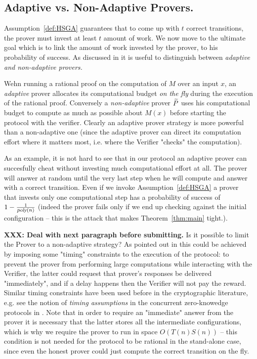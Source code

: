 \subsection{Adaptive vs. Non-Adaptive Provers.}

Assumption~\ref{def:HSGA} guarantees that to come up with $t$ correct transitions, the prover must invest at least $t$ amount of work. We now move to the ultimate goal which is to link the amount of work invested by the prover, to his probability of success. 
As discussed in \cite{cg15} it is useful to distinguish between {\em adaptive and non-adaptive provers.}

Wehn running a rational proof on the computation of $M$ over an input $x$, an {\em adaptive} prover allocates its computational budget  {\em on the fly} during the execution of the rational proof. Conversely a {\em non-adaptive} prover $\widetilde{P}$ uses his computational budget to compute as much as possible about $M(x)$ before starting the protocol with the verifier. Clearly an adaptive prover strategy is more powerful than a non-adaptive one (since the adaptive prover can direct its computation effort where it matters most, i.e. where the Verifier "checks" the computation).

As an example, it is not hard to see that in our protocol an adaptive prover can 
succesfully cheat without investing much computational effort at all. The prover will answer at random until the very last step when he will compute and answer with a correct transition. Even if we invoke Assumption~\ref{def:HSGA} a prover that invests only one computational step has a probability of success of  $1-\frac{1}{{\textsl{poly}}(n)}$ (indeed the prover fails only if we end up checking against the initial configuration -- this is the attack that makes Theorem~\ref{thm:main} tight.). 

\textbf{XXX: Deal with next paragraph before submitting.}
Is it possible to limit the Prover to a non-adaptive strategy? As pointed out in \cite{cg15} this could be achieved by imposing some "timing" constraints to the execution of the protocol: to prevent the prover from performing large computations while interacting with the Verifier, the latter could request that prover's responses be delivered "immediately", and if a delay happens then the Verifier will not pay the reward. Similar timing constraints have been used before in the cryptographic literature, e.g. see the notion of {\em timing assumptions} in the concurrent zero-knowedge protocols in \cite{dns}. Note that in order to require an "immediate" answer from the prover it is 
necessary that the latter stores all the intermediate configurations, which is why we require the prover to run in space $O(T(n)S(n))$ -- this condition is not needed for the protocol to be rational in the stand-alone case, since even the honest prover could just compute the correct transition on the fly. 


